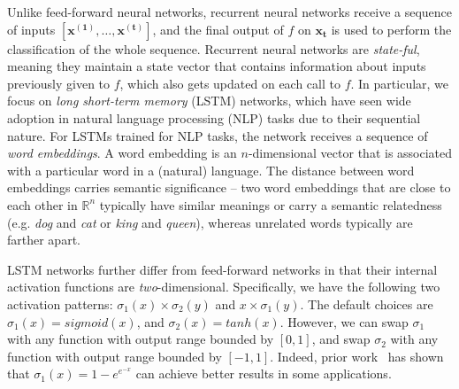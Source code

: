 Unlike feed-forward neural networks, recurrent neural networks receive a
sequence of inputs $ [\mathbf{x^{(1)}}, \dots, \mathbf{x^{(t)}} ] $, and the
final
output of $ f $ on $ \mathbf{x_t} $ is used to perform the classification of
the whole sequence. Recurrent neural networks are
\textit{state-ful}, meaning they maintain a state vector
that contains information about inputs previously given to
$ f $, which also gets updated on each call to $ f $.
%
In particular, we focus on \textit{long short-term memory} (LSTM) networks, which
have seen wide adoption in natural language processing (NLP) tasks due to their
sequential nature. For LSTMs trained for NLP tasks, the network receives a
sequence of \textit{word embeddings}. A word embedding is an $ n $-dimensional
vector that is associated with a particular word in a (natural) language. The
distance between word embeddings carries semantic significance -- two word
embeddings that are close to each other in $ \mathbb{R}^n $ typically have
similar meanings or carry a semantic relatedness (e.g. \textit{dog} and
\textit{cat} or \textit{king} and \textit{queen}), whereas unrelated words
typically are farther apart.

LSTM networks further differ from feed-forward networks in
that their internal activation functions are \textit{two}-dimensional.
Specifically, we have the following two activation patterns: $ \sigma_1(x)
\times \sigma_2(y) $ and $ x \times \sigma_1(y) $. The default choices are $
\sigma_1(x) = sigmoid(x) $, and $ \sigma_2(x) = tanh(x) $. However, we can swap
$ \sigma_1 $ with any function with output range bounded by $ [0, 1] $, and
swap $ \sigma_2 $ with any function with output range bounded by $ [-1, 1] $.
Indeed, prior work~\cite{gomes2008complementary} has shown that $ \sigma_1(x) =
1 - e^{e^{-x}} $ can achieve better results in some applications.



%

